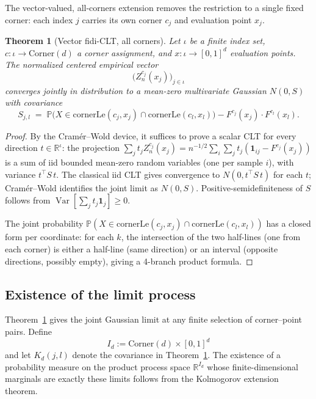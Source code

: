 \documentclass[pdflatex]{sn-jnl}
\theoremstyle{thmstyleone}
\newtheorem{theorem}{Theorem}[section]
\theoremstyle{thmstyletwo}
\theoremstyle{thmstylethree}
\newcommand{\R}{\mathbb{R}}
\newcommand{\Prob}{\mathbb{P}}
\DeclareMathOperator{\Var}{Var}
\begin{document}
The vector-valued, all-corners extension removes the restriction to a single fixed corner: each index $j$ carries its own corner $c_j$ and evaluation point $x_j$.

\begin{theorem}[Vector fidi-CLT, all corners]\label{thm:fidi-clt}
Let $\iota$ be a finite index set, $c : \iota\to\mathrm{Corner}(d)$ a corner assignment, and $x : \iota\to[0,1]^d$ evaluation points. The normalized centered empirical vector
\[
  \bigl(Z_n^{c_j}(x_j)\bigr)_{j\in\iota}
\]
converges jointly in distribution to a mean-zero multivariate Gaussian $N(0,S)$ with covariance
\[
  S_{j,l} \;=\; \Prob\bigl(X\in\mathrm{cornerLe}(c_j,x_j)\cap\mathrm{cornerLe}(c_l,x_l)\bigr) - F^{c_j}(x_j)\cdot F^{c_l}(x_l).
\]
\end{theorem}

\begin{proof}
By the Cram\'er--Wold device, it suffices to prove a scalar CLT for every direction $t\in\R^\iota$: the projection $\sum_j t_j Z_n^{c_j}(x_j) = n^{-1/2}\sum_i\sum_j t_j(\mathbf{1}_{ij} - F^{c_j}(x_j))$ is a sum of iid bounded mean-zero random variables (one per sample $i$), with variance $t^\top S\,t$. The classical iid CLT gives convergence to $N(0, t^\top S\,t)$ for each $t$; Cram\'er--Wold identifies the joint limit as $N(0,S)$. Positive-semidefiniteness of $S$ follows from $\Var[\sum_j t_j\mathbf{1}_j]\ge 0$.

The joint probability $\Prob(X\in\mathrm{cornerLe}(c_j,x_j)\cap\mathrm{cornerLe}(c_l,x_l))$ has a closed form per coordinate: for each $k$, the intersection of the two half-lines (one from each corner) is either a half-line (same direction) or an interval (opposite directions, possibly empty), giving a 4-branch product formula.
\end{proof}

\subsection{Existence of the limit process}\label{sec:limit-process}

Theorem~\ref{thm:fidi-clt} gives the joint Gaussian limit at any finite selection of corner--point pairs. Define
\[
  I_d:=\mathrm{Corner}(d)\times[0,1]^d
\]
and let $K_d(j,l)$ denote the covariance in Theorem~\ref{thm:fidi-clt}. The existence of a probability measure on the product process space $\R^{I_d}$ whose finite-dimensional marginals are exactly these limits follows from the Kolmogorov extension theorem.
\end{document}
